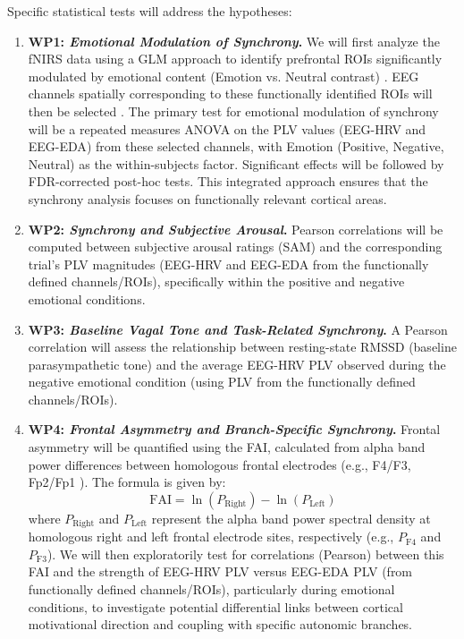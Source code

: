 \documentclass[12pt]{article} %
\begin{document}
Specific statistical tests will address the hypotheses:
\begin{enumerate}[label=(\alph*)]
    \item \textbf{\gls{WP}1: \emph{Emotional Modulation of Synchrony}.} We will first analyze the \gls{fNIRS} data using a \gls{GLM} approach to identify prefrontal \gls{ROI}s significantly modulated by emotional content (Emotion vs. Neutral contrast) \parencite{yucelBestPracticesFNIRS2021}. \gls{EEG} channels spatially corresponding to these functionally identified ROIs will then be selected \parencite{gramfortMEGEEGData2013}. The primary test for emotional modulation of synchrony will be a repeated measures \gls{ANOVA} on the \gls{PLV} values (\gls{EEG}-\gls{HRV} and \gls{EEG}-\gls{EDA}) from these selected channels, with Emotion (Positive, Negative, Neutral) as the within-subjects factor. Significant effects will be followed by FDR-corrected post-hoc tests. This integrated approach ensures that the synchrony analysis focuses on functionally relevant cortical areas.
    \item \textbf{\gls{WP}2: \emph{Synchrony and Subjective Arousal}.} Pearson correlations will be computed between subjective arousal ratings (\gls{SAM}) and the corresponding trial's \gls{PLV} magnitudes (\gls{EEG}-\gls{HRV} and \gls{EEG}-\gls{EDA} from the functionally defined channels/ROIs), specifically within the positive and negative emotional conditions.
    \item \textbf{\gls{WP}3: \emph{Baseline Vagal Tone and Task-Related Synchrony}.} A Pearson correlation will assess the relationship between resting-state \gls{RMSSD} (baseline parasympathetic tone) and the average \gls{EEG}-\gls{HRV} \gls{PLV} observed during the negative emotional condition (using PLV from the functionally defined channels/ROIs).
    \item \textbf{\gls{WP}4: \emph{Frontal Asymmetry and Branch-Specific Synchrony}.} Frontal asymmetry will be quantified using the \gls{FAI}, calculated from alpha band power differences between homologous frontal electrodes (e.g., F4/F3, Fp2/Fp1 \parencite{rodriguesMethodsMatterExamination2021, allenIssuesAssumptionsRoad2004}). The formula is given by:
    \begin{equation}
        \text{FAI} = \ln(P_{\text{Right}}) - \ln(P_{\text{Left}})
        \label{eq:fai} %
    \end{equation}
    where $P_{\text{Right}}$ and $P_{\text{Left}}$ represent the alpha band power spectral density at homologous right and left frontal electrode sites, respectively (e.g., $P_{\text{F4}}$ and $P_{\text{F3}}$). We will then exploratorily test for correlations (Pearson) between this \gls{FAI} and the strength of \gls{EEG}-\gls{HRV} \gls{PLV} versus \gls{EEG}-\gls{EDA} \gls{PLV} (from functionally defined channels/ROIs), particularly during emotional conditions, to investigate potential differential links between cortical motivational direction and coupling with specific autonomic branches.
\end{enumerate}
\end{document}
